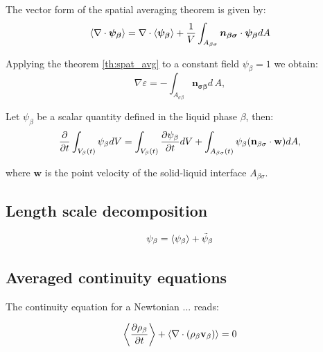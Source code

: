 \begin{corollary}
	The vector form of the spatial averaging theorem is given by:
	\begin{equation}
	{\left< \nabla \cdot \boldsymbol{\psi_{\beta}} \right>} = \nabla \cdot {\left<   \boldsymbol{\psi_{\beta}} \right>} + \dfrac{1}{V} \int_{A_{\beta \sigma}} \boldsymbol{n_{\beta \sigma}} \cdot \boldsymbol{\psi_{\beta}} dA
	\end{equation}
\end{corollary}

\begin{corollary}
	Applying the theorem \ref{th:spat_avg} to a constant field $\psi_{\beta} = 1$ we obtain:
	\begin{equation}
		\nabla \varepsilon = - \int_{A_{\sigma \beta}} \mathbf{n_{\sigma \beta}} d \, A,
	\end{equation}
\end{corollary}


\begin{theorem}
	Let $\psi_{\beta}$ be a scalar quantity defined in the liquid phase $\beta$, then:
	\begin{equation}
	\dfrac{\partial}{\partial t} \int_{V_\beta(t)} \psi_{\beta} dV =  \int_{V_\beta(t)} \dfrac{\partial \psi_{\beta}}{\partial t} dV + \int_{A_{\beta \sigma}(t)} \psi_{\beta} (\mathbf{n}_{\beta \sigma} \cdot \mathbf{w} ) dA,
	\label{th:transport}
	\end{equation}
	
	where $\mathbf{w}$ is the point velocity of the solid-liquid interface $A_{\beta \sigma}$.
\end{theorem}


\subsection{Length scale decomposition}

\begin{equation}
	\psi_{\beta} = {\left< \psi_{\beta} \right>} + \tilde{\psi}_{\beta}
 \end{equation}
 

\subsection{Averaged continuity equations}

The continuity equation for a Newtonian ... reads:

\begin{equation}
{\left< \dfrac{\partial \rho_{\beta}}{\partial t} \right>} + {\left< \nabla \cdot (\rho_{\beta}\textbf{v}_{\beta}) \right>}   = 0
\label{eq:superf_avg_cont}
\end{equation}

